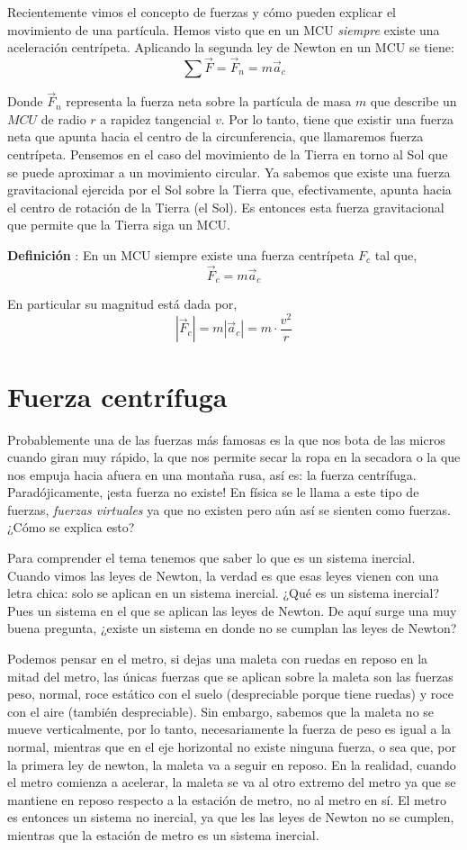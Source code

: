 \documentclass[letterpaper]{article}
\newcounter{definiciones}
\newcommand{\defii}{\stepcounter{definiciones} \textbf{Definición \thedefiniciones}: }
\newenvironment{defi}{\begin{framed} \defii}{\end{framed}}
\begin{document}
Recientemente vimos el concepto de fuerzas y cómo pueden explicar el movimiento de una partícula. Hemos visto que en un MCU \emph{siempre} existe una aceleración centrípeta. Aplicando la segunda ley de Newton en un MCU se tiene:
$$\sum \vec{F} = \vec{F}_n = m\vec{a}_c$$

Donde $\vec{F}_n$ representa la fuerza neta sobre la partícula de masa $m$ que describe un $MCU$ de radio $r$ a rapidez tangencial $v$. Por lo tanto, tiene que existir una fuerza neta que apunta hacia el centro de la circunferencia, que llamaremos fuerza centrípeta. Pensemos en el caso del movimiento de la Tierra en torno al Sol que se puede aproximar a un movimiento circular. Ya sabemos que existe una fuerza gravitacional ejercida por el Sol sobre la Tierra que, efectivamente, apunta hacia el centro de rotación de la Tierra (el Sol). Es entonces esta fuerza gravitacional que permite que la Tierra siga un MCU.

\begin{defi}
En un MCU siempre existe una fuerza centrípeta $F_c$ tal que,
$$\vec{F}_c = m\vec{a}_c$$

En particular su magnitud está dada por,
$$|\vec{F}_c| = m|\vec{a}_c| = m\cdot\frac{v^2}{r}$$
\end{defi}

\section*{Fuerza centrífuga}

Probablemente una de las fuerzas más famosas es la que nos bota de las micros cuando giran muy rápido, la que nos permite secar la ropa en la secadora o la que nos empuja hacia afuera en una montaña rusa, así es: la fuerza centrífuga. Paradójicamente, ¡esta fuerza no existe! En física se le llama a este tipo de fuerzas, \emph{fuerzas virtuales} ya que no existen pero aún así se sienten como fuerzas. ¿Cómo se explica esto?


Para comprender el tema tenemos que saber lo que es un sistema inercial. Cuando vimos las leyes de Newton, la verdad es que esas leyes vienen con una letra chica: solo se aplican en un sistema inercial. ¿Qué es un sistema inercial? Pues un sistema en el que se aplican las leyes de Newton. De aquí surge una muy buena pregunta, ¿existe un sistema en donde no se cumplan las leyes de Newton? 

Podemos pensar en el metro, si dejas una maleta con ruedas en reposo en la mitad del metro, las únicas fuerzas que se aplican sobre la maleta son las fuerzas peso, normal, roce estático con el suelo (despreciable porque tiene ruedas) y roce con el aire (también despreciable). Sin embargo, sabemos que la maleta no se mueve verticalmente, por lo tanto, necesariamente la fuerza de peso es igual a la normal, mientras que en el eje horizontal no existe ninguna fuerza, o sea que, por la primera ley de newton, la maleta va a seguir en reposo. En la realidad, cuando el metro comienza a acelerar, la maleta se va al otro extremo del metro ya que se mantiene en reposo respecto a la estación de metro, no al metro en sí. El metro es entonces un sistema no inercial, ya que les las leyes de Newton no se cumplen, mientras que la estación de metro es un sistema inercial.
\end{document}
